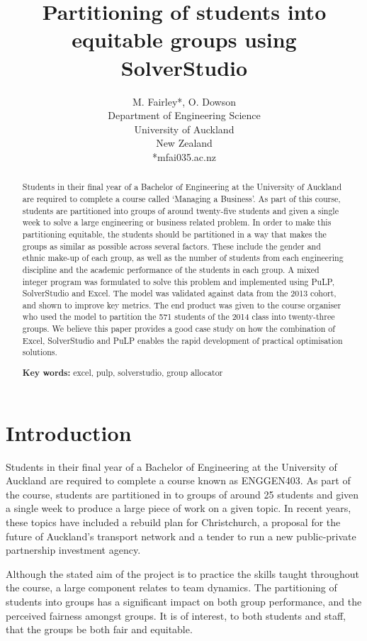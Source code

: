 \documentclass[12pt]{ORSNZ}
\title{Partitioning of students into equitable groups using SolverStudio}
\author{M. Fairley*, O. Dowson\\Department of Engineering Science\\University of
  Auckland\\New Zealand\\{*}mfai035\@@aucklanduni.ac.nz}
\date{} %
\begin{document}
\maketitle
\pagestyle{empty} \thispagestyle{empty}
\begin{abstract}
Students in their final year of a Bachelor of Engineering at the University of Auckland are required to complete a course called `Managing a Business'. As part of this course, students are partitioned into groups of around twenty-five students and given a single week to solve a large engineering or business related problem. In order to make this partitioning equitable, the students should be partitioned in a way that makes the groups as similar as possible across several factors. These include the gender and ethnic make-up of each group, as well as the number of students from each engineering discipline and the academic performance of the students in each group. A mixed integer program was formulated to solve this problem and implemented using PuLP, SolverStudio and Excel. The model was validated against data from the 2013 cohort, and shown to improve key metrics. The end product was given to the course organiser who used the model to partition the 571 students of the 2014 class into twenty-three groups. We believe this paper provides a good case study on how the combination of Excel, SolverStudio and PuLP enables the rapid development of practical optimisation solutions.

\textbf{Key words:} excel, pulp, solverstudio, group allocator
\end{abstract}

\section{Introduction}
Students in their final year of a Bachelor of Engineering at the University of Auckland are required to complete a course known as ENGGEN403. As part of the course, students are partitioned in to groups of around 25 students and given a single week to produce a large piece of work on a given topic. In recent years, these topics have included a rebuild plan for Christchurch, a proposal for the future of Auckland’s transport network and a tender to run a new public-private partnership investment agency.

Although the stated aim of the project is to practice the skills taught throughout the course, a large component relates to team dynamics. The partitioning of students into groups has a significant impact on both group performance, and the perceived fairness amongst groups. It is of interest, to both students and staff, that the groups be both fair and equitable.
\end{document}
